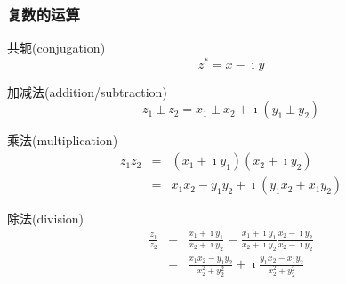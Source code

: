 \begin{frame}
    \frametitle{复数的运算}

        \begin{block}{共轭(conjugation)}
            \vspace*{-0.3cm}
            \begin{equation*}
                z^* = x -  \imath y
            \end{equation*}
        \end{block}
            \begin{block}{加减法(addition/subtraction)}
                \vspace*{-0.3cm}
                \begin{equation*}
                    z_1 \pm z_2 = x_1 \pm x_2 + \imath (y_1 \pm y_2)
                \end{equation*}
            \end{block}
            \begin{block}{乘法(multiplication)}
                \vspace*{-0.3cm}
                \begin{eqnarray*}
                    z_1 z_2&=& (x_1 +  \imath y_1 )  (x_2 +  \imath y_2 )
                    \\ 
                    &=& x_1 x_2 - y_1 y_2 + \imath  (y_1 x_2 + x_1 y_2)
                \end{eqnarray*}
            \end{block}
    \begin{block}{除法(division)}
        \vspace*{-0.3cm}
        \begin{eqnarray*}
            \frac{z_1}{z_2} & = & \frac{x_1 +  \imath y_1 }{x_2 +  \imath y_2 }
           = \frac{x_1 +  \imath y_1 }{x_2 +  \imath y_2 } \frac{x_2 -  \imath y_2 }{x_2 -  \imath y_2 }
            \\
            & = & \frac{x_1 x_2 - y_1 y_2} {x_2^2  +  y_2^2 }  + \imath \frac{y_1 x_2 - x_1 y_2} {x_2^2  +  y_2^2 } 
        \end{eqnarray*}
    \end{block}
\end{frame}

